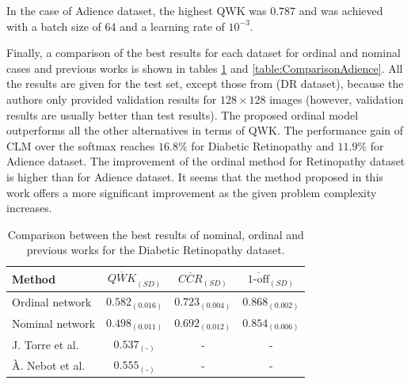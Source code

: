 \documentclass[journal]{IEEEtran}
\begin{document}
	In the case of Adience dataset, the highest QWK was $0.787$ and was achieved with a batch size of 64 and a learning rate of $10^{-3}$.

	Finally, a comparison of the best results for each dataset for ordinal and nominal cases and previous works is shown in tables \ref{table:ComparisonDR} and \ref{table:ComparisonAdience}. All the results are given for the test set, except those from \cite{de2018weighted} (DR dataset), because the authors only provided validation results for $128\times 128$ images (however, validation results are usually better than test results). The proposed ordinal model outperforms all the other alternatives in terms of QWK. The performance gain of CLM over the softmax reaches $16.8\%$ for Diabetic Retinopathy and $11.9\%$ for Adience dataset. The improvement of the ordinal method for Retinopathy dataset is higher than for Adience dataset. It seems that the method proposed in this work offers a more significant improvement as the given problem complexity increases.
	
	\begin{table}[!t]
		\caption{Comparison between the best results of nominal, ordinal and previous works for the Diabetic Retinopathy dataset.}
		\label{table:ComparisonDR}
		\scriptsize
		\centering
		\def\arraystretch{1.3}
		\begin{tabular}{lccc}
			\hline
			\hline
			Method                                   & $\overline{QWK}_{(SD)}$ & $\overline{CCR}_{(SD)}$ & $\overline{\text{1-off}}_{(SD)}$ \\ \hline
			Ordinal network                          &    $0.582_{(0.016)}$    &    $0.723_{(0.004)}$    &        $0.868_{(0.002)}$         \\
			Nominal network                          &    $0.498_{(0.011)}$    &    $0.692_{(0.012)}$    &        $0.854_{(0.006)}$         \\
			J. Torre et al. \cite{de2018weighted}    &  $0.537_{(\text{-})}$   &            -            &                -                 \\
			À. Nebot et al. \cite{nebot2016diabetic} &  $0.555_{(\text{-})}$   &            -            &                -					\\
			\hline
			\hline
		\end{tabular}
	\end{table}
	
\end{document}
